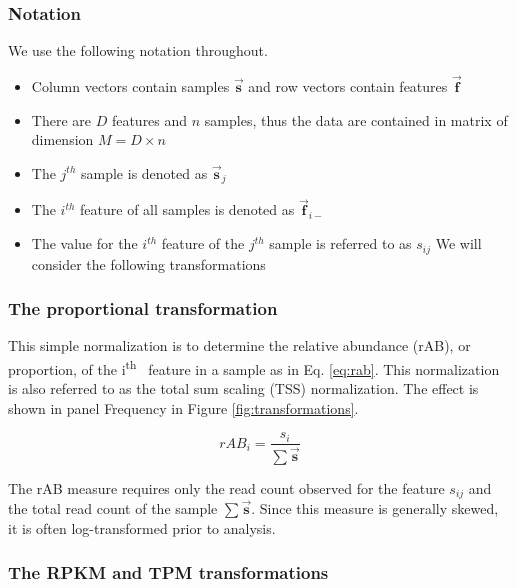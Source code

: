 \documentclass[onecolumn]{article}
\providecommand{\tightlist}{%
  \setlength{\itemsep}{0pt}\setlength{\parskip}{0pt}}
\newcommand{\ith}[1]{ #1\textsuperscript{th}\ }
\begin{document}
\hypertarget{notation}{%
\subsubsection{Notation}\label{notation}}

We use the following notation throughout.

\begin{itemize}
\tightlist
\item
  Column vectors contain samples \(\vec{\textbf{s}}\) and row vectors contain features \(\vec{\textbf{f}}\)
\item
  There are \(D\) features and \(n\) samples, thus the data are contained in matrix of dimension \(M = D \times n\)
\item
  The \(j^{th}\) sample is denoted as \(\vec{\textbf{s}}_{j}\)
\item
  The \(i^{th}\) feature of all samples is denoted as \(\vec{\textbf{f}}_{i-}\)
\item
  The value for the \(i^{th}\) feature of the \(j^{th}\) sample is referred to as \(s_{ij}\)
  We will consider the following transformations
\end{itemize}

\hypertarget{the-proportional-transformation}{%
\subsubsection{The proportional transformation}\label{the-proportional-transformation}}

This simple normalization is to determine the relative abundance (rAB), or proportion, of the \ith{i} feature in a sample as in Eq. \ref{eq:rab}. This normalization is also referred to as the total sum scaling (TSS) normalization. The effect is shown in panel Frequency in Figure \ref{fig:transformations}.

\begin{equation}
    rAB_{i} = \frac{s_{i}}{\sum{\vec{\textbf{s}}}}
    \label{eq:rab}
\end{equation}

The rAB measure requires only the read count observed for the feature \(s_{ij}\) and the total read count of the sample \(\sum{\vec{\textbf{s}}}\). Since this measure is generally skewed, it is often log-transformed prior to analysis.

\hypertarget{the-rpkm-and-tpm-transformations}{%
\subsubsection{The RPKM and TPM transformations}\label{the-rpkm-and-tpm-transformations}}
\end{document}
